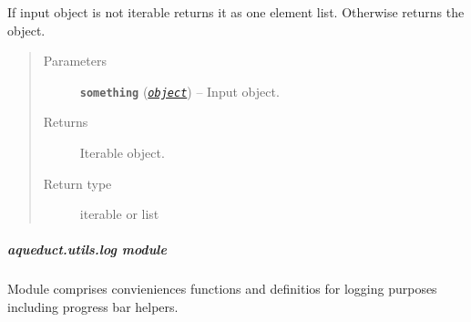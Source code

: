 \documentclass[a4paper,10pt,english]{sphinxmanual}
\begin{document}
\begin{fulllineitems}
\label{aqueduct.utils.helpers:aqueduct.utils.helpers.make_iterable}
If input object is not iterable returns it as one element list. Otherwise returns the object.
\begin{quote}\begin{description}
\item[{Parameters}] \leavevmode
\textbf{\texttt{something}} (\href{http://docs.python.org/2/library/functions.html\#object}{\emph{\texttt{object}}}) -- Input object.

\item[{Returns}] \leavevmode
Iterable object.

\item[{Return type}] \leavevmode
iterable or list

\end{description}\end{quote}

\end{fulllineitems}


\begin{fulllineitems}
\label{aqueduct.utils.helpers:aqueduct.utils.helpers.strech_zip}
\end{fulllineitems}


\begin{fulllineitems}
\label{aqueduct.utils.helpers:aqueduct.utils.helpers.compress_zip}
\end{fulllineitems}


\begin{fulllineitems}
\label{aqueduct.utils.helpers:aqueduct.utils.helpers.zip_zip}
\end{fulllineitems}



\subparagraph{aqueduct.utils.log module}
\label{aqueduct.utils.log::doc}\label{aqueduct.utils.log:module-aqueduct.utils.log}\label{aqueduct.utils.log:aqueduct-utils-log-module}
Module comprises convieniences functions and definitios for logging
purposes including progress bar helpers.
\end{document}
